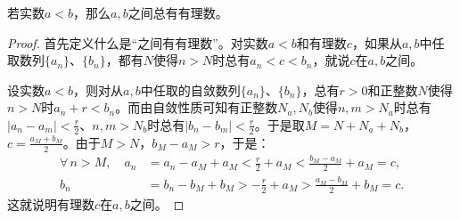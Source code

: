\documentclass[12pt,UTF8]{ctexbook}
\begin{document}
\begin{appendix}
\begin{tm}\label{tm:a-1-18}
    若实数$a<b$，那么$a,b$之间总有有理数。
\end{tm}
\begin{proof}
    首先定义什么是“之间有有理数”。对实数$a<b$和有理数$c$，如果从$a,b$中任取数列$\{a_n\}$、$\{b_n\}$，都有$N$使得$n>N$时总有$a_n < c < b_n$，就说$c$在$a,b$之间。

    设实数$a<b$，则对从$a,b$中任取的自敛数列$\{a_n\}$、$\{b_n\}$，总有$r>0$和正整数$N$使得$n>N$时$a_n + r < b_n$。而由自敛性质可知有正整数$N_a, N_b$使得$ n,m > N_a$时总有$|a_n - a_m| < \frac{r}{2}$、$ n,m > N_b$时总有$|b_n - b_m| < \frac{r}{2}$。于是取$M = N+N_a+N_b$，$c = \frac{a_{M} + b_{M}}{2}$。由于$M>N$，$b_{M} - a_{M} > r$，于是：
    \begin{align*}
       \forall \,n > M,\quad a_n &= a_n - a_{M} + a_{M} < \frac{r}{2} + a_{M} < \frac{b_M - a_M}{2} + a_M = c, \\
        b_n &= b_n - b_{M} + b_{M} > -\frac{r}{2} + a_{M} > \frac{a_M - b_M}{2} + b_M = c. 
    \end{align*}
    这就说明有理数$c$在$a,b$之间。
\end{proof}


\end{appendix}
\end{document}
